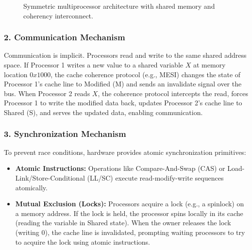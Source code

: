 \documentclass[11pt, a4paper]{article}
\begin{document}
\begin{figure}[htbp]
    \centering
    \caption{Symmetric multiprocessor architecture with shared memory and coherency interconnect.}
\end{figure}

\subsubsection*{2. Communication Mechanism}
Communication is implicit. Processors read and write to the same shared address space.
If Processor 1 writes a new value to a shared variable $X$ at memory location $0x1000$, the cache coherence protocol (e.g., MESI) changes the state of Processor 1's cache line to Modified (M) and sends an invalidate signal over the bus.
When Processor 2 reads $X$, the coherence protocol intercepts the read, forces Processor 1 to write the modified data back, updates Processor 2's cache line to Shared (S), and serves the updated data, enabling communication.

\subsubsection*{3. Synchronization Mechanism}
To prevent race conditions, hardware provides atomic synchronization primitives:
\begin{itemize}
    \item \textbf{Atomic Instructions:} Operations like Compare-And-Swap (CAS) or Load-Link/Store-Conditional (LL/SC) execute read-modify-write sequences atomically.
    \item \textbf{Mutual Exclusion (Locks):} Processors acquire a lock (e.g., a spinlock) on a memory address. If the lock is held, the processor spins locally in its cache (reading the variable in Shared state). When the owner releases the lock (writing 0), the cache line is invalidated, prompting waiting processors to try to acquire the lock using atomic instructions.
\end{itemize}
\end{document}
